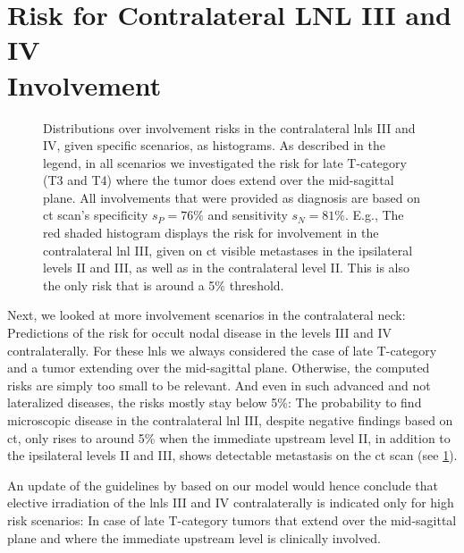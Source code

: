 \documentclass[\relativeRoot/main.tex]{subfiles}
\begin{document}
\section[Risk for Contralateral LNL III and IV Involvement]{Risk for Contralateral LNL III and IV\\Involvement}
\label{sec:complete:contraIIIandIV}

\begin{figure}
    \centering
    \def\svgwidth{1.0\textwidth}
    
    \caption[
        Risks for the contralateral LNLs III and IV, predicted by the complete model
    ]{
        Distributions over involvement risks in the contralateral \glspl{lnl} III and IV, given specific scenarios, as histograms. As described in the legend, in all scenarios we investigated the risk for late T-category (T3 and T4) where the tumor does extend over the mid-sagittal plane. All involvements that were provided as diagnosis are based on \gls{ct} scan's specificity $s_P = 76\%$ and sensitivity $s_N = 81\%$. E.g., The red shaded histogram displays the risk for involvement in the contralateral \gls{lnl} III, given on \gls{ct} visible metastases in the ipsilateral levels II and III, as well as in the contralateral level II. This is also the only risk that is around a 5\% threshold.
    }
    \label{fig:complete:contraIIIandIV}
\end{figure}

Next, we looked at more involvement scenarios in the contralateral neck: Predictions of the risk for occult nodal disease in the levels III and IV contralaterally. For these \glspl{lnl} we always considered the case of late T-category and a tumor extending over the mid-sagittal plane. Otherwise, the computed risks are simply too small to be relevant. And even in such advanced and not lateralized diseases, the risks mostly stay below 5\%: The probability to find microscopic disease in the contralateral \gls{lnl} III, despite negative findings based on \gls{ct}, only rises to around 5\% when the immediate upstream level II, in addition to the ipsilateral levels II and III, shows detectable metastasis on the \gls{ct} scan (see \cref{fig:complete:contraIIIandIV}).

An update of the guidelines by  based on our model would hence conclude that elective irradiation of the \glspl{lnl} III and IV contralaterally is indicated only for high risk scenarios: In case of late T-category tumors that extend over the mid-sagittal plane and where the immediate upstream level is clinically involved.
\end{document}
